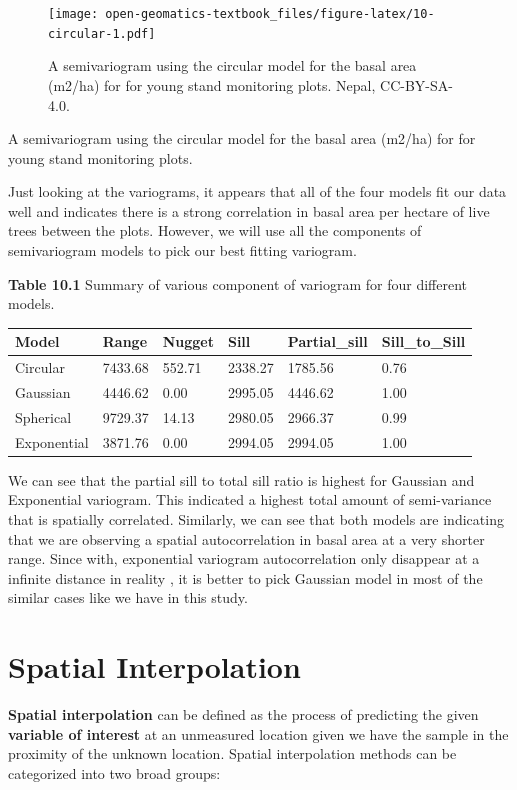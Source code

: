 \documentclass[
]{book}
\begin{document}
\begin{figure}
\centering
\texttt{[image: open-geomatics-textbook\_files/figure-latex/10-circular-1.pdf]}
\caption{\label{fig:10-circular}A semivariogram using the circular model for the basal area (m2/ha) for for young stand monitoring plots. Nepal, CC-BY-SA-4.0.}
\end{figure}

A semivariogram using the circular model for the basal area (m2/ha) for for young stand monitoring plots.

Just looking at the variograms, it appears that all of the four models fit our data well and indicates there is a strong correlation in basal area per hectare of live trees between the plots. However, we will use all the components of semivariogram models to pick our best fitting variogram.

\textbf{Table 10.1} Summary of various component of variogram for four different models.

\begin{tabular}{l|l|l|l|l|l}
\hline
Model & Range & Nugget & Sill & Partial\_sill & Sill\_to\_Sill\\
\hline
Circular & 7433.68 & 552.71 & 2338.27 & 1785.56 & 0.76\\
\hline
Gaussian & 4446.62 & 0.00 & 2995.05 & 4446.62 & 1.00\\
\hline
Spherical & 9729.37 & 14.13 & 2980.05 & 2966.37 & 0.99\\
\hline
Exponential & 3871.76 & 0.00 & 2994.05 & 2994.05 & 1.00\\
\hline
\end{tabular}

We can see that the partial sill to total sill ratio is highest for Gaussian and Exponential variogram. This indicated a highest total amount of semi-variance that is spatially correlated. Similarly, we can see that both models are indicating that we are observing a spatial autocorrelation in basal area at a very shorter range. Since with, exponential variogram autocorrelation only disappear at a infinite distance in reality , it is better to pick Gaussian model in most of the similar cases like we have in this study.

\hypertarget{spatial-interpolation}{%
\section{Spatial Interpolation}\label{spatial-interpolation}}

\textbf{Spatial interpolation} can be defined as the process of predicting the given \textbf{variable of interest} at an unmeasured location given we have the sample in the proximity of the unknown location. Spatial interpolation methods can be categorized into two broad groups:
\end{document}
